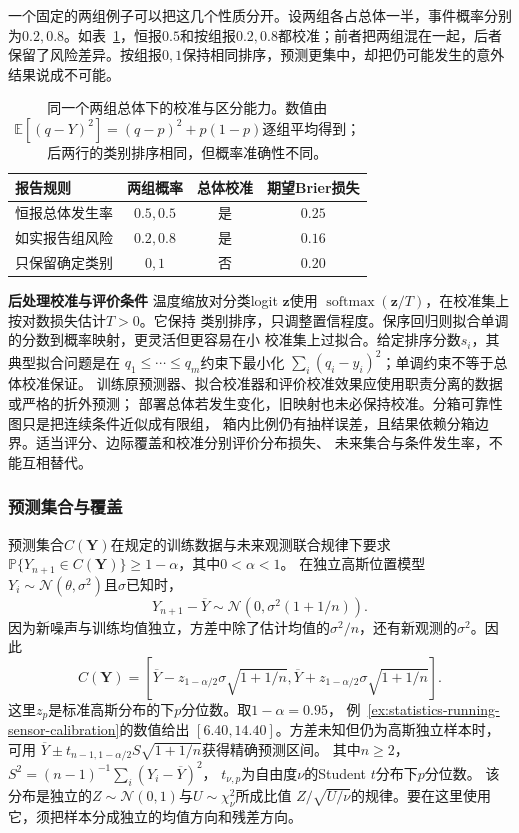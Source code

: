 一个固定的两组例子可以把这几个性质分开。设两组各占总体一半，事件概率分别为\(0.2,0.8\)。如表~\ref{tab:statistics-calibration-discrimination}，恒报\(0.5\)和按组报\(0.2,0.8\)都校准；前者把两组混在一起，后者保留了风险差异。按组报\(0,1\)保持相同排序，预测更集中，却把仍可能发生的意外结果说成不可能。
\begin{table}[htbp]
  \centering
  \small
  \begin{tabular}{lccc}
    \toprule
    报告规则 & 两组概率 & 总体校准 & 期望Brier损失 \\
    \midrule
    恒报总体发生率 & \(0.5,0.5\) & 是 & \(0.25\) \\
    如实报告组风险 & \(0.2,0.8\) & 是 & \(0.16\) \\
    只保留确定类别 & \(0,1\) & 否 & \(0.20\) \\
    \bottomrule
  \end{tabular}
  \caption{同一个两组总体下的校准与区分能力。数值由\(\mathbb E[(q-Y)^2]=(q-p)^2+p(1-p)\)逐组平均得到；后两行的类别排序相同，但概率准确性不同。}
  \label{tab:statistics-calibration-discrimination}
\end{table}

\par\medskip\noindent\textbf{后处理校准与评价条件}\quad
温度缩放对分类logit \(\bm z\)使用
\(\operatorname{softmax}(\bm z/T)\)，在校准集上按对数损失估计\(T>0\)。它保持
类别排序，只调整置信程度。保序回归则拟合单调的分数到概率映射，更灵活但更容易在小
校准集上过拟合。给定排序分数\(s_i\)，其典型拟合问题是在
\(q_1\leq\cdots\leq q_m\)约束下最小化
\(\sum_i(q_i-y_i)^2\)；单调约束不等于总体校准保证。
训练原预测器、拟合校准器和评价校准效果应使用职责分离的数据或严格的折外预测；
部署总体若发生变化，旧映射也未必保持校准。分箱可靠性图只是把连续条件近似成有限组，
箱内比例仍有抽样误差，且结果依赖分箱边界。适当评分、边际覆盖和校准分别评价分布损失、
未来集合与条件发生率，不能互相替代。

\subsubsection{预测集合与覆盖}
\label{sec:probability-exchangeability-conformal-ranks}
\label{sec:rv-prediction-sets}
预测集合\(C(\bm Y)\)在规定的训练数据与未来观测联合规律下要求
\(\mathbb P\{Y_{n+1}\in C(\bm Y)\}\geq1-\alpha\)，其中\(0<\alpha<1\)。
在独立高斯位置模型\(Y_i\sim\mathcal N(\theta,\sigma^2)\)且\(\sigma\)已知时，
\[
Y_{n+1}-\overline Y\sim\mathcal N(0,\sigma^2(1+1/n)).
\]
因为新噪声与训练均值独立，方差中除了估计均值的\(\sigma^2/n\)，还有新观测的\(\sigma^2\)。因此
\[
C(\bm Y)=\left[\overline Y-z_{1-\alpha/2}\sigma\sqrt{1+1/n},
\overline Y+z_{1-\alpha/2}\sigma\sqrt{1+1/n}\right].
\]
这里\(z_p\)是标准高斯分布的下\(p\)分位数。取\(1-\alpha=0.95\)，
例~\ref{ex:statistics-running-sensor-calibration}的数值给出
\([6.40,14.40]\)。方差未知但仍为高斯独立样本时，可用
\(\overline Y\pm t_{n-1,1-\alpha/2}S\sqrt{1+1/n}\)获得精确预测区间。
其中\(n\geq2\)，\(S^2=(n-1)^{-1}\sum_i(Y_i-\overline Y)^2\)，
\(t_{\nu,p}\)为自由度\(\nu\)的Student \(t\)分布下\(p\)分位数。
该分布是独立的\(Z\sim\mathcal N(0,1)\)与\(U\sim\chi_\nu^2\)所成比值
\(Z/\sqrt{U/\nu}\)的规律。要在这里使用它，须把样本分成独立的均值方向和残差方向。

